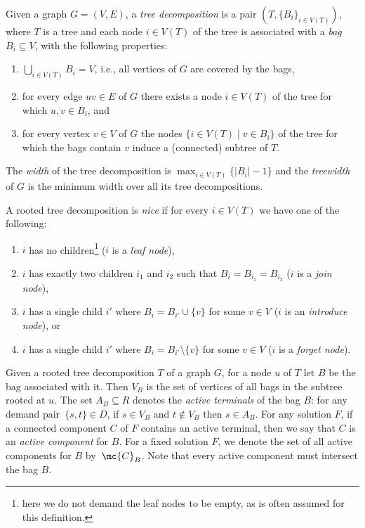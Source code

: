 \begin{definition} Given a graph $G=(V,E)$, a \emph{tree decomposition} is a
pair $(T,\{B_i\}_{i\in V(T)})$, where $T$ is a tree and each node $i\in V(T)$
of the tree is associated with a \emph{bag} $B_i\subseteq V$, with the
following properties: 
\begin{enumerate}
\item $\bigcup_{i\in V(T)} B_i=V$,
i.e., all vertices of $G$ are covered by the bags, 
\item for every edge $uv\in
E$ of $G$ there exists a node $i\in V(T)$ of the tree for which $u,v\in B_i$,
and 
\item for every vertex $v\in V$ of $G$ the nodes $\{i\in V(T)\mid v\in
B_i\}$ of the tree for which the bags contain $v$ induce a (connected) subtree
of $T$.  
\end{enumerate} 
The \emph{width} of the tree decomposition is
$\max_{i\in V(T)}\{|B_i|-1\}$ and the \emph{treewidth} of $G$ is the minimum
width over all its tree decompositions.  

A rooted tree decomposition is \emph{nice} if for every $i\in V(T)$ we have one of the
following: 

\begin{enumerate} 

\item $i$ has no children\footnote{here we do not demand the leaf nodes to be
empty, as is often assumed for this definition.} ($i$ is a \emph{leaf node}),

\item $i$ has exactly two children $i_1$ and $i_2$ such that
$B_i=B_{i_1}=B_{i_2}$ ($i$ is a \emph{join node}), 

\item $i$ has a single child $i'$ where $B_i=B_{i'}\cup \{v\}$ for some $v\in
V$ ($i$ is an \emph{introduce node}), or 

\item $i$ has a single child $i'$ where $B_i=B_{i'}\setminus \{v\}$ for some
$v\in V$ ($i$ is a \emph{forget node}).  

\end{enumerate}

\end{definition}

Given a rooted tree decomposition $T$ of a graph $G$, for a node $u$ of $T$ let
$B$ be the bag associated with it.  Then $V_B$ is the set of vertices of all
bags in the subtree rooted at $u$.  The set $A_B\subseteq R$ denotes the
\emph{active terminals} of the bag $B$: for any demand pair~$\{s,t\}\in D$, if
$s\in V_B$ and $t\notin V_B$ then $s\in A_B$.  For any \SF solution $F$, if a
connected component $C$ of $F$ contains an active terminal, then we say that
$C$ is an \emph{active component} for $B$. For a fixed solution $F$, we denote
the set of all active components for $B$ by~$\mc{C}_B$.  Note that every active
component must intersect the bag $B$. 

